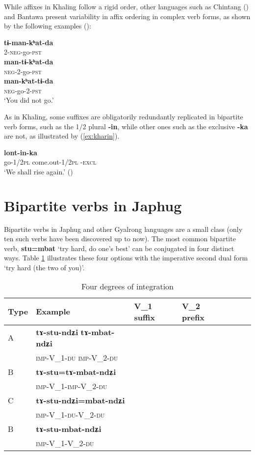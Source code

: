 \documentclass[oldfontcommands,oneside,a4paper,11pt]{article}
\newcommand{\ipa}[1]{{\phon\textbf{#1}}}
\newcommand{\Y}{\Checkmark}
\newcommand{\N}{}
\newcommand{\jpg}[2]{\ipa{#1} `#2'}
\newcommand{\refb}[1]{(\ref{#1})}
\begin{document}
While affixes in Khaling follow a rigid order, other languages such as Chintang (\citealt{bickel07chintang}) and Bantawa present variability in affix ordering in complex verb forms, as shown by the following examples (\citealt[170-172]{doornenbal09}):

\begin{exe}
\ex 
\gll 
\ipa{tɨ-man-kʰat-da} \\
2-\textsc{neg}-go-\textsc{pst} \\
\ex
\gll 
\ipa{man-tɨ-kʰat-da} \\
\textsc{neg}-2-go-\textsc{pst} \\
\ex 
\gll 
\ipa{man-kʰat-tɨ-da} \\
\textsc{neg}-go-2-\textsc{pst} \\
\glt `You did not go.'
\end{exe}

As in Khaling, some suffixes are obligatorily redundantly replicated in bipartite verb forms, such as the 1/2 plural \ipa{-in}, while other ones such as the exclusive \ipa{-ka} are not, as illustrated by \refb{ex:kharin}.

 \begin{exe}
\ex  \label{ex:kharin}
\gll \ipa{kʰar-in} \ipa{lont-in-ka} \\
go-\textsc{1/2pl} come.out-\textsc{1/2pl -excl} \\
\glt `We shall rise again.' (\citealt[254]{doornenbal09})
\end{exe}



\section{Bipartite verbs in Japhug}

Bipartite verbs in Japhug and other Gyalrong languages are a small class (only ten such verbs have been discovered up to now). 
The most common bipartite verb, \jpg{stu=mbat}{try hard, do one's best} can be conjugated in four distinct ways. Table \ref{tab:four} illustrates these four options with the imperative second dual form `try hard (the two of you)'.


\begin{table}[h]
\caption{Four degrees of integration} \centering \label{tab:four}
\begin{tabular}{lllllll}
\toprule
Type & Example & V_1 suffix & V_2 prefix \\
\midrule
A& \ipa{tɤ-stu-ndʑi} \ipa{tɤ-mbat-ndʑi} &\Y &\Y \\
 &\textsc{imp}-V_1-\textsc{du}  \textsc{imp}-V_2-\textsc{du} \\
B& \ipa{tɤ-stu=tɤ-mbat-ndʑi} &\N  &\Y \\
 &\textsc{imp}-V_1-\textsc{imp}-V_2-\textsc{du} \\
C& \ipa{tɤ-stu-ndʑi=mbat-ndʑi} &\Y  &\N \\
 &\textsc{imp}-V_1-\textsc{du}-V_2-\textsc{du} \\
B& \ipa{tɤ-stu-mbat-ndʑi} &\N  &\N \\
 &\textsc{imp}-V_1-V_2-\textsc{du} \\
\bottomrule
\end{tabular}
\end{table}
\end{document}
